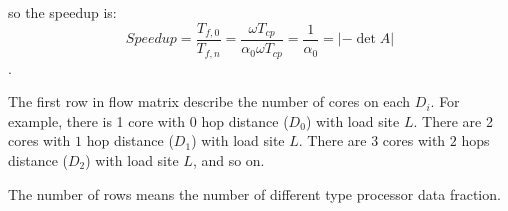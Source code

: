 so the speedup is:
$$Speedup = \frac{T_{f, 0}}{T_{f, n}}= \frac{\omega T_{cp}}{\alpha_{0}\omega T_{cp}} = \frac{1}{\alpha_{0}} = \left |-\det A \right |$$.

The first row in flow matrix describe the number of cores on each $D_{i}$.
  For example, there is 1 core with $0$ hop distance ($D_{0}$) with load site $L$.  There are 2 cores with $1$ hop distance ($D_{1}$) with load site $L$.  There are 3 cores with $2$ hops distance ($D_{2}$) with load site $L$, and so on.
  
  The number of rows means the number of different type processor data fraction.  












